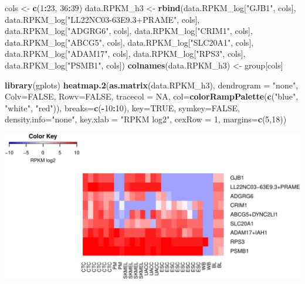 \documentclass[]{article}
\newenvironment{Shaded}{\begin{snugshade}}{\end{snugshade}}
\newcommand{\KeywordTok}[1]{\textcolor[rgb]{0.13,0.29,0.53}{\textbf{#1}}}
\newcommand{\DataTypeTok}[1]{\textcolor[rgb]{0.13,0.29,0.53}{#1}}
\newcommand{\DecValTok}[1]{\textcolor[rgb]{0.00,0.00,0.81}{#1}}
\newcommand{\StringTok}[1]{\textcolor[rgb]{0.31,0.60,0.02}{#1}}
\newcommand{\OtherTok}[1]{\textcolor[rgb]{0.56,0.35,0.01}{#1}}
\newcommand{\OperatorTok}[1]{\textcolor[rgb]{0.81,0.36,0.00}{\textbf{#1}}}
\newcommand{\NormalTok}[1]{#1}
\begin{document}
\begin{Shaded}
\begin{Highlighting}[]
\NormalTok{cols <-}\StringTok{ }\KeywordTok{c}\NormalTok{(}\DecValTok{1}\OperatorTok{:}\DecValTok{23}\NormalTok{, }\DecValTok{36}\OperatorTok{:}\DecValTok{39}\NormalTok{)}
\NormalTok{data.RPKM_h3 <-}\StringTok{ }\KeywordTok{rbind}\NormalTok{(data.RPKM_log[}\StringTok{"GJB1"}\NormalTok{, cols], data.RPKM_log[}\StringTok{"LL22NC03-63E9.3+PRAME"}\NormalTok{, cols],}
\NormalTok{                      data.RPKM_log[}\StringTok{"ADGRG6"}\NormalTok{, cols], data.RPKM_log[}\StringTok{"CRIM1"}\NormalTok{, cols],}
\NormalTok{                      data.RPKM_log[}\StringTok{"ABCG5"}\NormalTok{, cols], data.RPKM_log[}\StringTok{"SLC20A1"}\NormalTok{, cols],}
\NormalTok{                      data.RPKM_log[}\StringTok{"ADAM17"}\NormalTok{, cols], data.RPKM_log[}\StringTok{"RPS3"}\NormalTok{, cols],}
\NormalTok{                      data.RPKM_log[}\StringTok{"PSMB1"}\NormalTok{, cols])}
\KeywordTok{colnames}\NormalTok{(data.RPKM_h3) <-}\StringTok{ }\NormalTok{group[cols]}

\KeywordTok{library}\NormalTok{(gplots)}
\KeywordTok{heatmap.2}\NormalTok{(}\KeywordTok{as.matrix}\NormalTok{(data.RPKM_h3), }\DataTypeTok{dendrogram =} \StringTok{"none"}\NormalTok{, }\DataTypeTok{Colv=}\OtherTok{FALSE}\NormalTok{, }\DataTypeTok{Rowv=}\OtherTok{FALSE}\NormalTok{,}
          \DataTypeTok{tracecol =} \OtherTok{NA}\NormalTok{, }\DataTypeTok{col=}\KeywordTok{colorRampPalette}\NormalTok{(}\KeywordTok{c}\NormalTok{(}\StringTok{"blue"}\NormalTok{, }\StringTok{"white"}\NormalTok{, }\StringTok{"red"}\NormalTok{)),}
          \DataTypeTok{breaks=}\KeywordTok{c}\NormalTok{(}\OperatorTok{-}\DecValTok{10}\OperatorTok{:}\DecValTok{10}\NormalTok{), }\DataTypeTok{key=}\OtherTok{TRUE}\NormalTok{, }\DataTypeTok{symkey=}\OtherTok{FALSE}\NormalTok{, }\DataTypeTok{density.info=}\StringTok{"none"}\NormalTok{,}
          \DataTypeTok{key.xlab =} \StringTok{"RPKM log2"}\NormalTok{, }\DataTypeTok{cexRow =} \DecValTok{1}\NormalTok{, }\DataTypeTok{margins=}\KeywordTok{c}\NormalTok{(}\DecValTok{5}\NormalTok{,}\DecValTok{18}\NormalTok{))}
\end{Highlighting}
\end{Shaded}

\includegraphics{Project_jankauskaite_ugne_files/figure-latex/unnamed-chunk-39-1.pdf}
\end{document}
